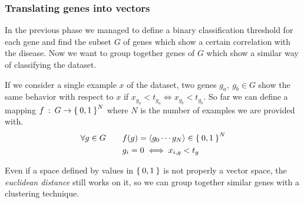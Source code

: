    \subsubsection{ Translating genes into vectors }

        In the previous phase we managed to define a binary classification
        threshold for each gene and find the subset $G$ of genes which
        show a certain correlation with the disease. Now we want to group
        together genes of $G$ which show a similar way of classifying the
        dataset.

        If we consider a single example $x$ of the dataset, two genes $g_a,
        \:g_b \in G$ show the same behavior with respect to $x$ if $x_{g_a}
        < t_{g_a} \iff x_{g_b} < t_{g_b}$. So far we can define a mapping
        $f \::\: G \rightarrow \Set{0, 1}^N$ where $N$ is the number of
        examples we are provided with.
        \begin{align*}
        \forall g \in G \qquad
            & f(g) = \left \langle {g_0 \cdots g_N} \right \rangle  \in \Set{0, 1}^N \\
            & g_i = 0 \iff x_{i,g} < t_g
        \end{align*}

        Even if a space defined by values in $\Set{0, 1}$ is not properly
        a vector space, the \emph{euclidean distance} still works on it,
        so we can group together similar genes with a clustering
        technique.

